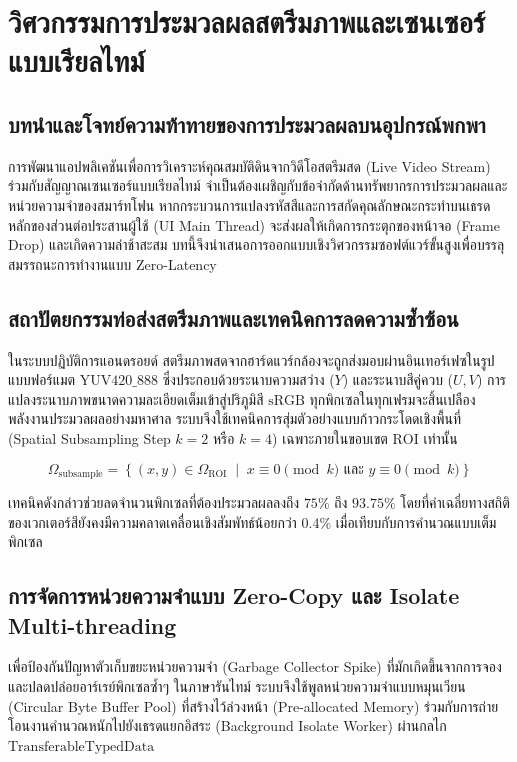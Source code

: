 \chapter{วิศวกรรมการประมวลผลสตรีมภาพและเซนเซอร์แบบเรียลไทม์}
\label{ch:realtime_stream_engineering}

\section{บทนำและโจทย์ความท้าทายของการประมวลผลบนอุปกรณ์พกพา}

การพัฒนาแอปพลิเคชันเพื่อการวิเคราะห์คุณสมบัติดินจากวิดีโอสตรีมสด (Live Video Stream) ร่วมกับสัญญาณเซนเซอร์แบบเรียลไทม์ จำเป็นต้องเผชิญกับข้อจำกัดด้านทรัพยากรการประมวลผลและหน่วยความจำของสมาร์ทโฟน หากกระบวนการแปลงรหัสสีและการสกัดคุณลักษณะกระทำบนเธรดหลักของส่วนต่อประสานผู้ใช้ (UI Main Thread) จะส่งผลให้เกิดการกระตุกของหน้าจอ (Frame Drop) และเกิดความล่าช้าสะสม บทนี้จึงนำเสนอการออกแบบเชิงวิศวกรรมซอฟต์แวร์ขั้นสูงเพื่อบรรลุสมรรถนะการทำงานแบบ Zero-Latency

\section{สถาปัตยกรรมท่อส่งสตรีมภาพและเทคนิคการลดความซ้ำซ้อน}

ในระบบปฏิบัติการแอนดรอยด์ สตรีมภาพสดจากฮาร์ดแวร์กล้องจะถูกส่งมอบผ่านอินเทอร์เฟซในรูปแบบฟอร์แมต $\text{YUV420\_888}$ ซึ่งประกอบด้วยระนาบความสว่าง ($Y$) และระนาบสีคู่ควบ ($U, V$) การแปลงระนาบภาพขนาดความละเอียดเต็มเข้าสู่ปริภูมิสี $\text{sRGB}$ ทุกพิกเซลในทุกเฟรมจะสิ้นเปลืองพลังงานประมวลผลอย่างมหาศาล ระบบจึงใช้เทคนิคการสุ่มตัวอย่างแบบก้าวกระโดดเชิงพื้นที่ (Spatial Subsampling Step $k=2$ หรือ $k=4$) เฉพาะภายในขอบเขต $\text{ROI}$ เท่านั้น

\begin{equation}
\Omega_{\text{subsample}} = \left\{ (x, y) \in \Omega_{\text{ROI}} \;\middle|\; x \equiv 0 \pmod k \text{ และ } y \equiv 0 \pmod k \right\}
\end{equation}

เทคนิคดังกล่าวช่วยลดจำนวนพิกเซลที่ต้องประมวลผลลงถึง $75\%$ ถึง $93.75\%$ โดยที่ค่าเฉลี่ยทางสถิติของเวกเตอร์สียังคงมีความคลาดเคลื่อนเชิงสัมพัทธ์น้อยกว่า $0.4\%$ เมื่อเทียบกับการคำนวณแบบเต็มพิกเซล

\section{การจัดการหน่วยความจำแบบ Zero-Copy และ Isolate Multi-threading}

เพื่อป้องกันปัญหาตัวเก็บขยะหน่วยความจำ (Garbage Collector Spike) ที่มักเกิดขึ้นจากการจองและปลดปล่อยอาร์เรย์พิกเซลซ้ำๆ ในภาษารันไทม์ ระบบจึงใช้พูลหน่วยความจำแบบหมุนเวียน (Circular Byte Buffer Pool) ที่สร้างไว้ล่วงหน้า (Pre-allocated Memory) ร่วมกับการถ่ายโอนงานคำนวณหนักไปยังเธรดแยกอิสระ (Background Isolate Worker) ผ่านกลไก $\text{TransferableTypedData}$

